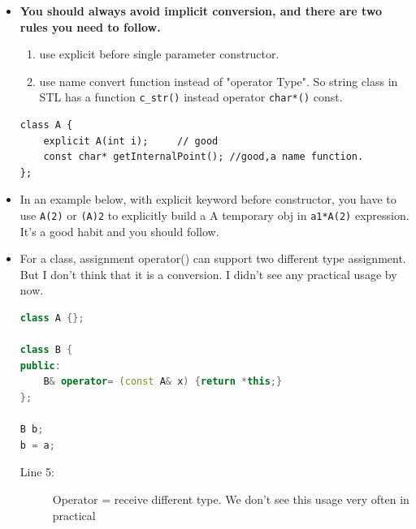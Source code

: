 \documentclass[a4paper,11pt,twoside]{book}
\begin{document}
\begin{itemize}
	\item \textbf{You should always avoid implicit conversion, and there are two rules you need to follow.}
	\begin{enumerate}
		\item use explicit before single parameter constructor.
		\item use name convert function instead of  "operator Type". So string class in STL has a function \texttt{c\_str()} instead operator \texttt{char*()} const. 
	\end{enumerate}
\begin{lstlisting}[numbers=none]
class A {
	explicit A(int i);     // good
	const char* getInternalPoint(); //good,a name function.
};	
\end{lstlisting}
	
	\item In an example below, with explicit keyword before constructor,  you have to use \texttt{A(2)} or \texttt{(A)2} to explicitly build a A temporary obj in \texttt{a1*A(2)} expression. It's a good habit and you should follow. 
	
	
	\item For a class, assignment operator() can support two different type assignment. But I don't think that it is a conversion. I didn't see any practical usage by now. 
\begin{lstlisting}[frame=single, language=c++]
class A {};
	
class B {
public:
	B& operator= (const A& x) {return *this;}
};
	
B b;
b = a; 
\end{lstlisting}
\begin{description}
	\item[Line 5:] Operator = receive different type. We don't see this usage very often in practical 
\end{description}
\end{itemize}
\end{document}
